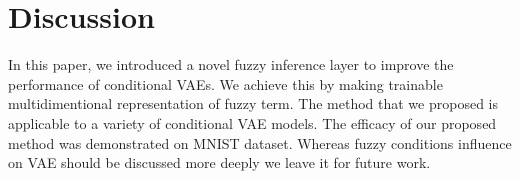 \documentclass[runningheads]{llncs}
\begin{document}
\section{Discussion}


In this paper, we introduced a novel fuzzy inference layer to improve the performance of conditional VAEs. 
We achieve this by making trainable multidimentional representation of fuzzy term.
The method that we proposed is applicable to a variety of conditional VAE models. 
The efficacy of our proposed method was demonstrated on MNIST dataset. 
Whereas fuzzy conditions influence on VAE should be discussed more deeply we leave it for future work. 



\end{document}
